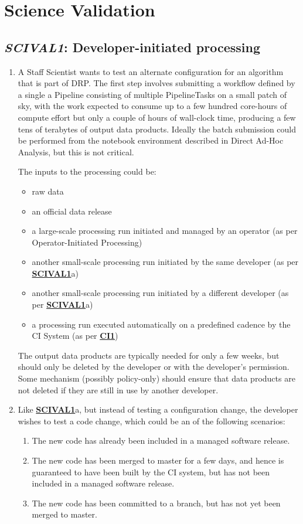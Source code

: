 \documentclass[DM,toc,lsstdraft]{lsstdoc}
\newcommand{\usecase}[3]{%
\subsection{\emph{#1}: #2}
\label{use:#1}
\begin{enumerate}[label=\alph*.]
#3
\end{enumerate}
}
\newcommand{\useref}[1]{\hyperref[use:#1]{\textcolor{lsstblue}{\textbf{#1}}}}
\begin{document}
\section{Science Validation}


\usecase{SCIVAL1}{Developer-initiated processing}{%

\item
A Staff Scientist wants to test an alternate configuration for an algorithm that is part of DRP.
The first step involves submitting a workflow defined by a single a Pipeline consisting of multiple PipelineTasks on a small patch of sky, with the work expected to consume up to a few hundred core-hours of compute effort but only a couple of hours of wall-clock time, producing a few tens of terabytes of output data products.
Ideally the batch submission could be performed from the notebook environment described in Direct Ad-Hoc Analysis, but this is not critical.

The inputs to the processing could be:
\begin{itemize}
\item raw data
\item an official data release
\item a large-scale processing run initiated and managed by an operator (as per Operator-Initiated Processing)
\item another small-scale processing run initiated by the same developer (as per \useref{SCIVAL1}a)
\item another small-scale processing run initiated by a different developer (as per \useref{SCIVAL1}a)
\item a processing run executed automatically on a predefined cadence by the CI System (as per \useref{CI1})
\end{itemize}

The output data products are typically needed for only a few weeks, but should only be deleted by the developer or with the developer's permission.  Some mechanism (possibly policy-only) should ensure that data products are not deleted if they are still in use by another developer.

\item
Like \useref{SCIVAL1}a, but instead of testing a configuration change, the developer wishes to test a code change, which could be an of the following scenarios:

\begin{enumerate}
\item The new code has already been included in a managed software release.
\item The new code has been merged to master for a few days, and hence is guaranteed to have been built by the CI system, but has not been included in a managed software release.
\item The new code has been committed to a branch, but has not yet been merged to master.
\end{enumerate}

}
\end{document}
